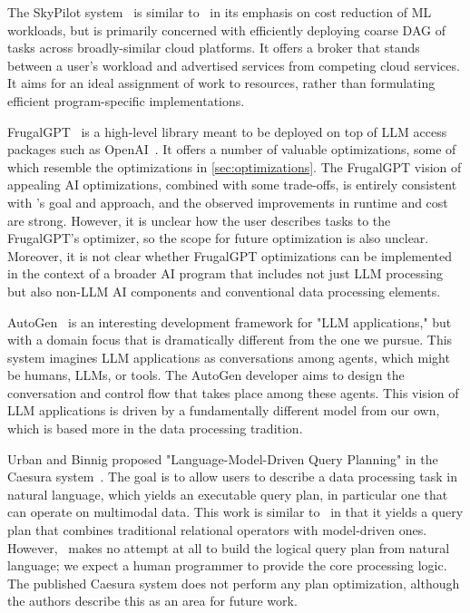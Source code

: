 The SkyPilot system~\cite{Yang2023SkyPilotAI} is similar to \system\ in its emphasis on cost reduction of ML workloads, but is primarily concerned with efficiently deploying coarse DAG of tasks across broadly-similar cloud platforms.  It offers a broker that stands between a user's workload and advertised services from competing cloud services. It aims for an ideal assignment of work to resources, rather than formulating efficient program-specific implementations.

FrugalGPT~\cite{chen2023frugalgpt} is a high-level library meant to be deployed on top of LLM access packages such as OpenAI~\cite{openaiapi}. It offers a number of valuable optimizations, some of which resemble the optimizations in \autoref{sec:optimizations}. The FrugalGPT vision of appealing AI optimizations, combined with some trade-offs, is entirely consistent with \system's goal and approach, and the observed improvements in runtime and cost are strong. However, it is unclear how the user describes tasks to the FrugalGPT's optimizer, so the scope for future optimization is also unclear. Moreover, it is not clear whether FrugalGPT optimizations can be implemented in the context of a broader AI program that includes not just LLM processing but also non-LLM AI components and conventional data processing elements.

AutoGen~\cite{wu2023autogen} is an interesting development framework for "LLM applications," but with a domain focus that is dramatically different from the one we pursue. This system imagines LLM applications as conversations among agents, which might be humans, LLMs, or tools. The AutoGen developer aims to design the conversation and control flow that takes place among these agents. This vision of LLM applications is driven by a fundamentally different model from our own, which is based more in the data processing tradition.

Urban and Binnig proposed "Language-Model-Driven Query Planning" in the Caesura system~\cite{urban2023caesura}. The goal is to allow users to describe a data processing task in natural language, which yields an executable query plan, in particular one that can operate on multimodal data. This work is similar to \system\ in that it yields a query plan that combines traditional relational operators with model-driven ones. However, \system\ makes no attempt at all to build the logical query plan from natural language; we expect a human programmer to provide the core processing logic. The published Caesura system does not perform any plan optimization, although the authors describe this as an area for future work.

